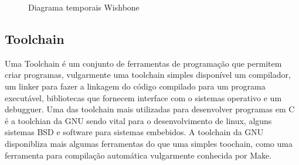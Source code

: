 \begin{figure}[!htb]
  \begin{subfigmatrix}{3}
  \end{subfigmatrix} 
  \caption{Diagrama temporais Wishbone}
  \label{ondas:wishbone}
\end{figure}

\subsection{Toolchain}

Uma Toolchain é um conjunto de ferramentas de programação que permitem criar programas, vulgarmente uma toolchain simples disponível um compilador, um linker para fazer a linkagem do código compilado para um programa executável, bibliotecas que fornecem interface com o sistemas operativo e um debugguer. Uma das toolchain mais utilizadas para desenvolver programas em C é a toolchian da GNU sendo vital para o desenvolvimento de linux, alguns sistemas BSD e software para sistemas embebidos. A toolchain da GNU disponibliza mais algumas ferramentas do que uma simples toochain, como uma ferramenta para compilação automática vulgarmente conhecida por Make.

